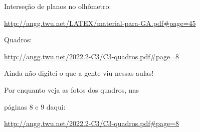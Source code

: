 \documentclass[oneside,12pt]{article}
\begin{document}
\ssk

Interseção de planos no olhômetro:


{\scriptsize

\url{http://angg.twu.net/LATEX/material-para-GA.pdf#page=45}

}

\ssk

Quadros:

{\scriptsize

\url{http://angg.twu.net/2022.2-C3/C3-quadros.pdf\#page=8}

}




\newpage


Ainda não digitei o que a gente viu nessas aulas!

Por enquanto veja as fotos dos quadros, nas

páginas 8 e 9 daqui:

\ssk

{\scriptsize

\url{http://angg.twu.net/2022.2-C3/C3-quadros.pdf\#page=8}

}





\end{document}
